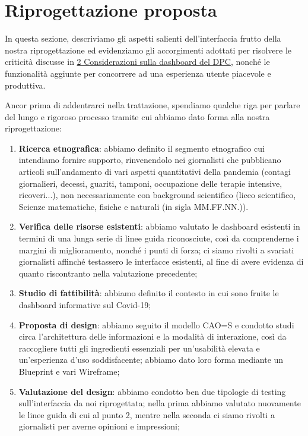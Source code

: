 \documentclass[../../main.tex]{subfiles}
\begin{document}
\section{Riprogettazione proposta}
In questa sezione, descriviamo gli aspetti salienti dell'interfaccia frutto della nostra riprogettazione ed evidenziamo gli accorgimenti adottati per risolvere le criticità discusse in \hyperref[s:considerazioni]{2 Considerazioni sulla dashboard del DPC}, nonché le funzionalità aggiunte per concorrere ad una esperienza utente piacevole e produttiva.

Ancor prima di addentrarci nella trattazione, spendiamo qualche riga per parlare del lungo e  rigoroso processo tramite cui abbiamo dato forma alla nostra riprogettazione:
\begin{enumerate}
    \item \textbf{Ricerca etnografica}: abbiamo definito il segmento etnografico cui intendiamo fornire supporto, rinvenendolo nei giornalisti che pubblicano articoli sull'andamento di vari aspetti quantitativi della pandemia (contagi giornalieri, decessi, guariti, tamponi, occupazione delle terapie intensive, ricoveri...), non necessariamente con background scientifico (liceo scientifico, Scienze matematiche, fisiche e naturali (in sigla MM.FF.NN.)).
    \item \textbf{Verifica delle risorse esistenti}: abbiamo valutato le dashboard esistenti in termini di una lunga serie di linee guida riconosciute, così da comprenderne i margini di miglioramento, nonché i punti di forza; ci siamo rivolti a svariati giornalisti affinché testassero le interfacce esistenti, al fine di avere evidenza di quanto riscontranto nella valutazione precedente;
    \item \textbf{Studio di fattibilità}: abbiamo definito il contesto in cui sono fruite le dashboard informative sul Covid-19;
    \item \textbf{Proposta di design}: abbiamo seguito il modello CAO=S e condotto studi circa l'architettura delle informazioni e la modalità di interazione, così da raccogliere tutti gli ingredienti essenziali per un'usabilità elevata e un'esperienza d'uso soddisfacente; abbiamo dato  loro forma mediante un Blueprint e vari Wireframe;
    \item \textbf{Valutazione del design}: abbiamo condotto ben due tipologie di testing sull'interfaccia da noi riprogettata; nella prima abbiamo valutato nuovamente le linee guida di cui al punto 2, mentre nella seconda ci siamo rivolti a giornalisti per averne opinioni e impressioni;
\end{enumerate}
\end{document}
